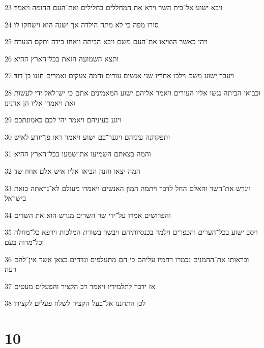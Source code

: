 \par 23 ויבא ישוע אל־בית השר וירא את המחללים בחלילים ואת־העם ההומה ויאמר׃
\par 24 סורו מפה כי לא מתה הילדה אך ישנה היא וישחקו לו׃
\par 25 ויהי כאשר הוציאו את־העם משם ויבא הביתה ויאחז בידה ותקם הנערה׃
\par 26 ותצא השמועה הזאת בכל־הארץ ההיא׃
\par 27 ויעבר ישוע משם וילכו אחריו שני אנשים עורים והמה צעקים ואמרים חננו בן־דוד׃
\par 28 וכבואו הביתה נגשו אליו העורים ויאמר אליהם ישוע המאמינים אתם כי יש־לאל ידי לעשות זאת ויאמרו אליו הן אדנינו׃
\par 29 ויגע בעיניהם ויאמר יהי לכם כאמונתכם׃
\par 30 ותפקחנה עיניהם ויגער־בם ישוע ויאמר ראו פן־יודע לאיש׃
\par 31 והמה בצאתם השמיעו את־שמעו בכל־הארץ ההיא׃
\par 32 המה יצאו והנה הביאו אליו איש אלם אחוז שד׃
\par 33 ויגרש את־השד והאלם החל לדבר ויתמה המון האנשים ויאמרו מעולם לא־נראתה כזאת בישראל׃
\par 34 והפרושים אמרו על־ידי שר השדים מגרש הוא את השדים׃
\par 35 ויסב ישוע בכל־הערים והכפרים וילמד בכנסיותיהם ויבשר בשורת המלכות וירפא כל־מחלה וכל־מדוה בעם׃
\par 36 ובראותו את־ההמנים נכמרו רחמיו עליהם כי הם מתעלפים ונדחים כצאן אשר אין־להם רעה׃
\par 37 אז ידבר לתלמידיו ויאמר רב הקציר והפעלים מעטים׃
\par 38 לכן התחננו אל־בעל הקציר לשלח פעלים לקצירו׃

\chapter{10}

